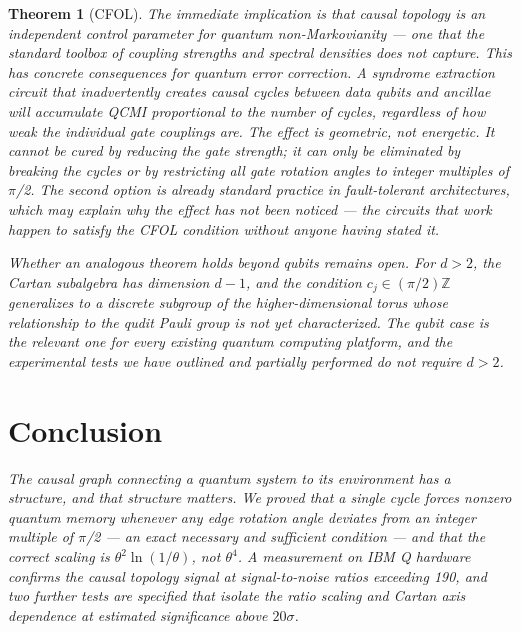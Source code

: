 \documentclass[twocolumn,aps,prl]{revtex4-2}
\newtheorem{theorem}{Theorem}
\begin{document}
\begin{theorem}[CFOL]
The immediate implication is that causal topology is an independent control parameter for quantum non-Markovianity — one that the standard toolbox of coupling strengths and spectral densities does not capture. This has concrete consequences for quantum error correction. A syndrome extraction circuit that inadvertently creates causal cycles between data qubits and ancillae will accumulate QCMI proportional to the number of cycles, regardless of how weak the individual gate couplings are. The effect is geometric, not energetic. It cannot be cured by reducing the gate strength; it can only be eliminated by breaking the cycles or by restricting all gate rotation angles to integer multiples of $\pi$/2. The second option is already standard practice in fault-tolerant architectures, which may explain why the effect has not been noticed — the circuits that work happen to satisfy the CFOL condition without anyone having stated it.

Whether an analogous theorem holds beyond qubits remains open. For $d>2$, the Cartan subalgebra has dimension $d-1$, and the condition $c_j\in(\pi/2)\mathbb{Z}$ generalizes to a discrete subgroup of the higher-dimensional torus whose relationship to the qudit Pauli group is not yet characterized. The qubit case is the relevant one for every existing quantum computing platform, and the experimental tests we have outlined and partially performed do not require $d>2$.

\section{Conclusion}

The causal graph connecting a quantum system to its environment has a structure, and that structure matters. We proved that a single cycle forces nonzero quantum memory whenever any edge rotation angle deviates from an integer multiple of $\pi$/2 — an exact necessary and sufficient condition — and that the correct scaling is $\theta^2\ln(1/\theta)$, not $\theta^4$. A measurement on IBM Q hardware confirms the causal topology signal at signal-to-noise ratios exceeding 190, and two further tests are specified that isolate the ratio scaling and Cartan axis dependence at estimated significance above $20\sigma$.


\end{theorem}
\end{document}
